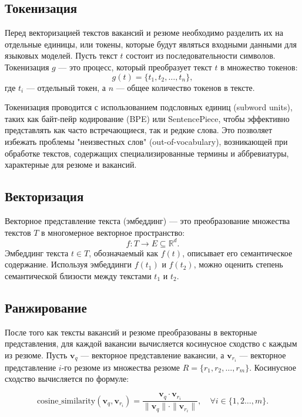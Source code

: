 \documentclass{article}
\begin{document}
\subsection{Токенизация}

Перед векторизацией текстов вакансий и резюме необходимо разделить их на отдельные единицы, или токены, которые будут являться входными данными для языковых моделей. Пусть текст \( t \) состоит из последовательности символов. Токенизация \( g \) — это процесс, который преобразует текст \( t \) в множество токенов:  
\[
g(t) = \{t_1, t_2, \dots, t_n\}, 
\]  
где \( t_i \) — отдельный токен, а \( n \) — общее количество токенов в тексте.  

Токенизация проводится с использованием подсловных единиц (subword units), таких как байт-пейр кодирование (BPE) или SentencePiece, чтобы эффективно представлять как часто встречающиеся, так и редкие слова. Это позволяет избежать проблемы "неизвестных слов" (out-of-vocabulary), возникающей при обработке текстов, содержащих специализированные термины и аббревиатуры, характерные для резюме и вакансий.

\subsection{Векторизация}

Векторное представление текста (эмбеддинг) — это преобразование множества текстов \( T \) в многомерное векторное пространство:  
\[
f : T \to E \subseteq \mathbb{R}^d.
\]  
Эмбеддинг текста \( t \in T \), обозначаемый как \( f(t) \), описывает его семантическое содержание. Используя эмбеддинги \( f(t_1) \) и \( f(t_2) \), можно оценить степень семантической близости между текстами \( t_1 \) и \( t_2 \).

\subsection{Ранжирование}

После того как тексты вакансий и резюме преобразованы в векторные представления, для каждой вакансии вычисляется косинусное сходство с каждым из резюме. Пусть \( \mathbf{v}_q \) — векторное представление вакансии, а \( \mathbf{v}_{r_i} \) — векторное представление \( i \)-го резюме из множества резюме \( R = \{r_1, r_2, \dots, r_m\} \). Косинусное сходство вычисляется по формуле:  

\[
\text{cosine\_similarity}(\mathbf{v}_q, \mathbf{v}_{r_i}) = \frac{\mathbf{v}_q \cdot \mathbf{v}_{r_i}}{\|\mathbf{v}_q\| \cdot \|\mathbf{v}_{r_i}\|}, \quad \forall i \in \{1, 2\dots, m\}.
\]  
\end{document}
